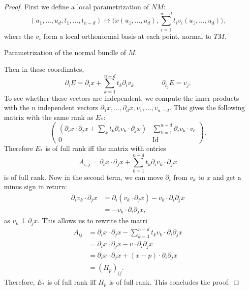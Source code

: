 \begin{proof}
    First we define a local parametrization of $NM$:
    \[
        (u_1, \ldots, u_d, t_1, \ldots, t_{n-d}) \mapsto \Big(x(u_1, \ldots, u_d), \sum_{i=1}^{n-d} t_i v_i(u_1, \ldots, u_{d})\Big)
    ,\] 
    where the $v_i$ form a local orthonormal basis at each point, normal to $TM$.
\begin{marginfigure}
    \centering
    \caption{Parametrization of the normal bundle of $M$.}
    \label{fig:abundance-of-morse-functions-parametrization-of-the-normal-bundle}
\end{marginfigure}
    Then in these coordinates,
    \[
        \partial_i E = \partial_i x  + \sum_{k=1}^{n-d} t_k \partial_i v_k 
        \qquad
        \qquad
        \partial_{t_j} E  = v_j
    .\]
    To see whether these vectors are independent, we compute the inner products with the $n$ independent vectors $\partial_1 x , \ldots, \partial_d x , v_1, \ldots, v_{n-d}$. 
    This gives the following matrix with the same rank as $E_*$:
     \[
    \begin{pmatrix}
        (\partial_i x\cdot \partial_j x + \sum_k t_k \partial_iv_{k} \cdot \partial_j x) &  \sum_{k=1}^{n-d} \partial_i v_{k} \cdot  v_\ell\\
        0 & \operatorname{Id}
    \end{pmatrix}
    .\] 
    Therefore $E_*$ is of full rank iff the matrix with entries
    \[
        A_{i, j} = \partial_i x\cdot \partial_j x + \sum_{k=1}^{n-d} t_k \partial_iv_{k} \cdot \partial_j x \]  is of full rank.
    Now in the second term, we can move $\partial_i$ from $v_k$ to $x$ and get a minus sign in return:
    \begin{align*}
        \partial_iv_{k} \cdot \partial_j x &= \partial_i (v_k \cdot \partial_j x)  - v_k \cdot  \partial_i \partial_j x\\
                               &= - v_k \cdot  \partial_i \partial_j x
    ,\end{align*} 
    as $v_k \perp \partial_j x$.
    This allows us to rewrite the matri
    \begin{align*}
        A_{ij} &=  \partial_i x\cdot \partial_j x - \sum_{k=1}^{n-d} t_k v_{k} \cdot \partial_i \partial_j x  \\
        &= \partial_i x\cdot \partial_j x - v \cdot \partial_i \partial_j x  \\
        &= \partial_i x\cdot \partial_j x + (x-p) \cdot \partial_i \partial_j x  \\
        &= (H_p)_{ij}
    .\end{align*} 
    Therefore, $E_*$ is of full rank iff $H_p$ is of full rank.
    This concludes the proof.
\end{proof}

